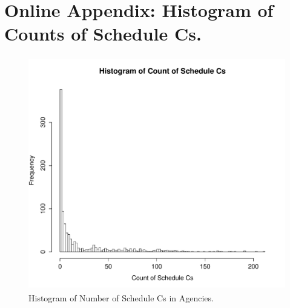 \documentclass[12pt]{article}
\begin{document}
\newpage
\section*{Online Appendix: Histogram of Counts of Schedule Cs.}
\begin{figure}[!h]
\begin{center}
\includegraphics[height=4in,width=5in]{HistogramScheduleCCount.pdf}
\caption{Histogram of Number of Schedule Cs in Agencies.}
\end{center}
\end{figure}




	


\end{document}
